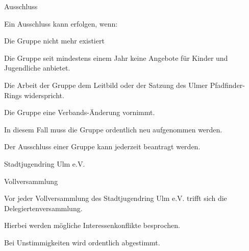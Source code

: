 \begin{legal}
\begin{legal}
\begin{legal}
                \end{legal}
            \item Ausschluss
                \begin{legal}
                    \item Ein Ausschluss kann erfolgen, wenn:
                        \begin{legal}
                            \item Die Gruppe nicht mehr existiert
                            \item Die Gruppe seit mindestens einem Jahr keine Angebote für Kinder 
                                  und Jugendliche anbietet.
                            \item Die Arbeit der Gruppe dem Leitbild oder der Satzung des Ulmer 
                                  Pfadfinder-Rings widerspricht.
                            \item Die Gruppe eine Verbands-Änderung vornimmt.
                                \begin{legal}
                                    \item In diesem Fall muss die Gruppe ordentlich neu aufgenommen 
                                          werden.
                                \end{legal}
                        \end{legal}
                    \item Der Ausschluss einer Gruppe kann jederzeit beantragt werden.
                \end{legal}
        \end{legal}
    \item Stadtjugendring Ulm e.V.
        \begin{legal}
            \item Vollversammlung
                \begin{legal}
                    \item Vor jeder Vollversammlung des Stadtjugendring Ulm e.V. trifft sich die 
                          Delegiertenversammlung.
                    \item Hierbei werden mögliche Interessenkonflikte besprochen.
                        \begin{legal}
                            \item Bei Unstimmigkeiten wird ordentlich abgestimmt.
                        \end{legal}

\end{legal}
\end{legal}
\end{legal}
